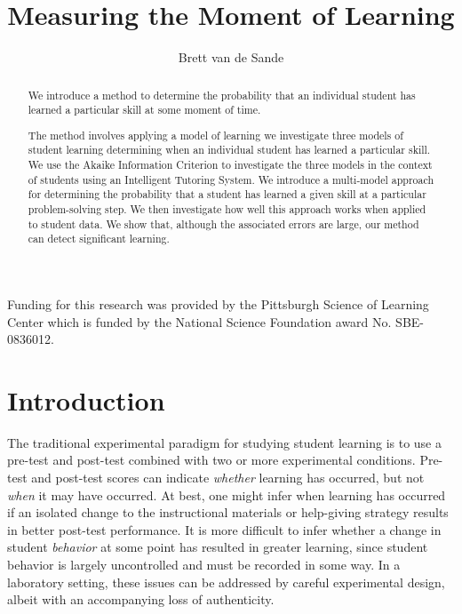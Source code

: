 \documentclass{acmlarge-edm}
\begin{document}
\title{Measuring the Moment of Learning}
\author{Brett van de Sande
}

%

\begin{abstract}
We introduce a method to determine the probability that an individual 
student has learned a particular skill at some moment of time. 

The method involves applying a model of learning
we investigate three 
models of student learning 
determining when an individual student has learned a particular skill.
We use the Akaike Information Criterion to investigate the three
models in the context of students using an Intelligent Tutoring System.  
We introduce a multi-model approach for determining 
the probability that a student has learned a given skill at a 
particular problem-solving step.  We then investigate how well this
approach works when applied to student data.  We show that, although the
associated errors are large, our method can detect significant learning. 
\end{abstract}


\begin{bottomstuff}
Funding for this research was provided by the Pittsburgh Science of
Learning Center which is funded by the National Science Foundation
award No. SBE-0836012.
\end{bottomstuff}


\maketitle


\section{Introduction}

%
%


The traditional experimental paradigm for studying student learning
is to use a pre-test and post-test combined with two or more experimental
conditions.  Pre-test and post-test scores can indicate {\em whether}
learning has occurred, but not {\em when} it may have occurred.  
At best, one might infer when learning has occurred if an isolated change to 
the instructional materials or help-giving strategy results in better
post-test performance.  
It is more difficult to infer whether a change in student {\em behavior} at
some point has resulted in greater learning, since student behavior is 
largely uncontrolled and must be recorded in some way.
In a laboratory setting, these issues can be addressed by careful
experimental design, albeit with an accompanying loss of authenticity.
\end{document}
